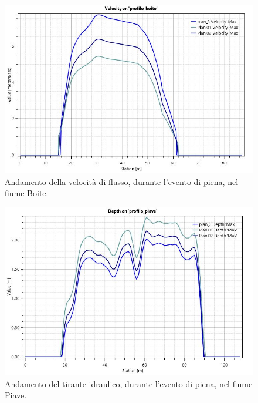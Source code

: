 \begin{figure}[htb] \centering
    \includegraphics[scale=0.5]{immagini/velocity_boite.JPG}
    \caption{Andamento della velocità di flusso, durante l'evento di piena, nel fiume Boite.}
    \label{figure:velocity_boite}
\end{figure}

\begin{figure}[htb] \centering
    \includegraphics[scale=0.5]{immagini/depth_piave.JPG}
    \caption{Andamento del tirante idraulico, durante l'evento di piena, nel fiume Piave.}
    \label{figure:depth_piave}
\end{figure}

